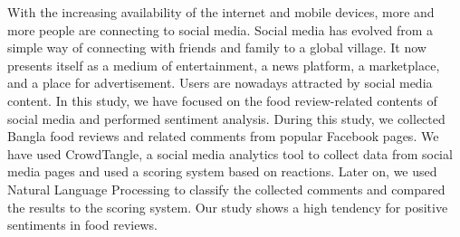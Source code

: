 With the increasing availability of the internet and mobile devices, more and more people are connecting to social media. Social media has evolved from a simple way of connecting with friends and family to a global village. It now presents itself as a medium of entertainment, a news platform, a marketplace, and a place for advertisement. Users are nowadays attracted by social media content. In this study, we have focused on the food review-related contents of social media and performed sentiment analysis.  During this study, we collected Bangla food reviews and related comments from popular Facebook pages. We have used CrowdTangle, a social media analytics tool to collect data from social media pages and used a scoring system based on reactions. Later on, we used Natural Language Processing to classify the collected comments and compared the results to the scoring system. Our study shows a high tendency for positive sentiments in food reviews.

\endinput
